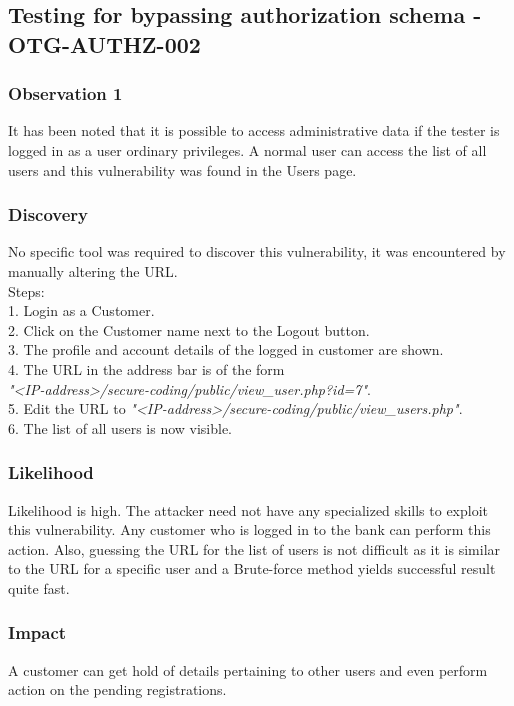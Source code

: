 \subsection{Testing for bypassing authorization schema - OTG-AUTHZ-002}

\subsubsection{Observation 1}
It has been noted that it is possible to access administrative data if the tester is logged in as a user ordinary privileges. A normal user can access the list of all users and this
vulnerability was found in the Users page.

\subsubsection{Discovery}
No specific tool was required to discover this vulnerability, it was encountered by manually altering the URL.\\
Steps: \\
1. Login as a Customer. \\
2. Click on the Customer name next to the Logout button. \\
3. The profile and account details of the logged in customer are shown. \\
4. The URL in the address bar is of the form \\ \textit{"<IP-address>/secure-coding/public/view\_user.php?id=7"}. \\
5. Edit the URL to \textit{"<IP-address>/secure-coding/public/view\_users.php"}. \\
6. The list of all users is now visible.


\subsubsection{Likelihood}
Likelihood is high.
The attacker need not have any specialized skills to exploit this vulnerability. Any customer who is logged in to the bank can perform this action. Also, guessing the URL for the list of users is not difficult as it is similar to the URL for a specific user and a Brute-force method yields successful result quite fast.

\subsubsection{Impact}
A customer can get hold of details pertaining to other users and even perform action on the pending registrations.

